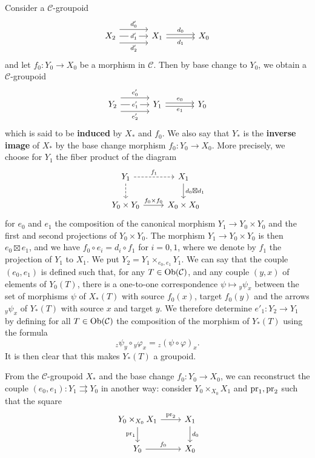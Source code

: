 Consider a $\mathcal{C}$-groupoid
\[\begin{tikzcd}[column sep=12mm]
X_2\ar[r,shift left=8pt,"d_0'"]\ar[r,shift right=8pt,swap,"d_2'"]\ar[r,"d_1'"description]&X_1\ar[r,shift left=2pt,"d_0"]\ar[r,shift right=2pt,swap,"d_1"]&X_0
\end{tikzcd}\]
and let $f_0:Y_0\to X_0$ be a morphism in $\mathcal{C}$. Then by base change to $Y_0$, we obtain a $\mathcal{C}$-groupoid
\[\begin{tikzcd}[column sep=12mm]
Y_2\ar[r,shift left=8pt,"e_0'"]\ar[r,shift right=8pt,swap,"e_2'"]\ar[r,"e_1'"description]&Y_1\ar[r,shift left=2pt,"e_0"]\ar[r,shift right=2pt,swap,"e_1"]&Y_0
\end{tikzcd}\]
which is said to be \textbf{induced} by $X_*$ and $f_0$. We also say that $Y_*$ is the \textbf{inverse image} of $X_*$ by the base change morphism $f_0:Y_0\to X_0$. More precisely, we choose for $Y_1$ the fiber product of the diagram
\[\begin{tikzcd}
Y_1\ar[d,dashed]\ar[r,dashed,"f_1"]&X_1\ar[d,"d_0\boxtimes d_1"]\\
Y_0\times Y_0\ar[r,"f_0\times f_0"]&X_0\times X_0
\end{tikzcd}\]
for $e_0$ and $e_1$ the composition of the canonical morphism $Y_1\to Y_0\times Y_0$ and the first and second projections of $Y_0\times Y_0$. The morphism $Y_1\to Y_0\times Y_0$ is then $e_0\boxtimes e_1$, and we have $f_0\circ e_i=d_i\circ f_1$ for $i=0,1$, where we denote by $f_1$ the projection of $Y_1$ to $X_1$. We put $Y_2=Y_1\times_{e_0,e_1}Y_1$. We can say that the couple $(e_0,e_1)$ is defined such that, for any $T\in\mathrm{Ob}(\mathcal{C})$, and any couple $(y,x)$ of elements of $Y_0(T)$, there is a one-to-one correspondence $\psi\mapsto{_y\psi_x}$ between the set of morphisms $\psi$ of $X_*(T)$ with source $f_0(x)$, target $f_0(y)$ and the arrows ${_y\psi_x}$ of $Y_*(T)$ with source $x$ and target $y$. We therefore determine $e'_1:Y_2\to Y_1$ by defining for all $T\in\mathrm{Ob}(\mathcal{C})$ the composition of the morphism of $Y_*(T)$ using the formula
\[{_z\psi_y}\circ{_y\varphi_x}={_z(\psi\circ\varphi)_x}.\]
It is then clear that this makes $Y_*(T)$ a groupoid.\par
From the $\mathcal{C}$-groupoid $X_*$ and the base change $f_0:Y_0\to X_0$, we can reconstruct the couple $(e_0,e_1):Y_1\rightrightarrows Y_0$ in another way: consider $Y_0\times_{X_0}X_1$ and $\mathrm{pr}_1,\mathrm{pr}_2$ such that the square
\begin{equation}\label{category groupoid base change Y_1 square-1}
\begin{tikzcd}
Y_0\times_{X_0}X_1\ar[d,swap,"\pr_1"]\ar[r,"\pr_2"]&X_1\ar[d,"d_0"]\\
Y_0\ar[r,"f_0"]&X_0
\end{tikzcd}
\end{equation}
